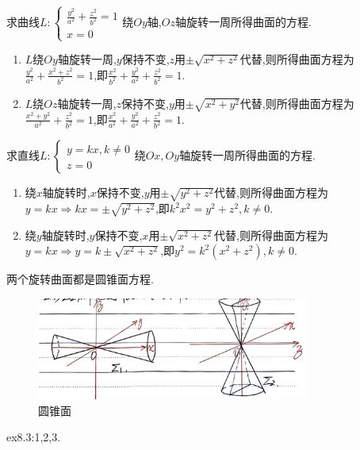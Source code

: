 \begin{example}
    求曲线$L:\begin{cases}
        \frac{y^2}{a^2} + \frac{z^2}{b^2} = 1\\
        x = 0
    \end{cases}$绕$Oy$轴,$Oz$轴旋转一周所得曲面的方程.

\end{example}

\begin{solution}
\begin{enumerate}
    \item $L$绕$Oy$轴旋转一周,$y$保持不变,$z$用$\pm \sqrt{x^2 + z^2}$代替,则所得曲面方程为
    $\frac{y^2}{a^2} + \frac{x^2 + z^2}{b^2} = 1$,即$\frac{x^2}{b^2} + \frac{y^2}{a^2} + \frac{z^2}{b^2} = 1$.
    \item $L$绕$Oz$轴旋转一周,$z$保持不变,$y$用$\pm \sqrt{x^2 + y^2}$代替,则所得曲面方程为
    $\frac{x^2 + y^2}{a^2} + \frac{z^2}{b^2} = 1$,即$\frac{x^2}{a^2} + \frac{y^2}{a^2} + \frac{z^2}{b^2} = 1$.
\end{enumerate}
\end{solution}

\begin{example}
    求直线$L:\begin{cases}
        y = kx,k \neq 0\\
        z = 0
    \end{cases}$绕$Ox,Oy$轴旋转一周所得曲面的方程.
\end{example}

\begin{solution}
    \begin{enumerate}
        \item 绕$x$轴旋转时,$x$保持不变,$y$用$\pm \sqrt{y^2 + z^2}$代替,则所得曲面方程为
        $y = kx \Rightarrow kx = \pm \sqrt{y^2 + z^2}$,即$k^2x^2 = y^2 + z^2,k \neq 0$.
        \item 绕$y$轴旋转时,$y$保持不变,$x$用$\pm \sqrt{x^2 + z^2}$代替,则所得曲面方程为
        $y = kx \Rightarrow y = k \pm \sqrt{x^2 + z^2}$,即$y^2 = k^2(x^2 + z^2),k \neq 0$.
    \end{enumerate}

    两个旋转曲面都是圆锥面方程.
\end{solution}

\begin{figure}[htbp]
    \centering
    \includegraphics[width=0.8\textwidth]{figure/4-11.png}
    \caption{圆锥面}
    \label{fig:圆锥面}
\end{figure}


\begin{homework}
ex8.3:1,2,3.
\end{homework}







